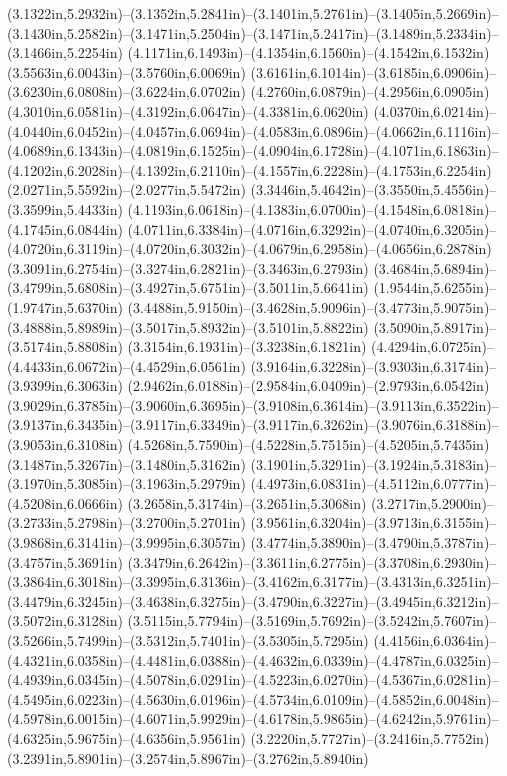 (3.1322in,5.2932in)--(3.1352in,5.2841in)--(3.1401in,5.2761in)--(3.1405in,5.2669in)--(3.1430in,5.2582in)--(3.1471in,5.2504in)--(3.1471in,5.2417in)--(3.1489in,5.2334in)--(3.1466in,5.2254in) (4.1171in,6.1493in)--(4.1354in,6.1560in)--(4.1542in,6.1532in) (3.5563in,6.0043in)--(3.5760in,6.0069in) (3.6161in,6.1014in)--(3.6185in,6.0906in)--(3.6230in,6.0808in)--(3.6224in,6.0702in) (4.2760in,6.0879in)--(4.2956in,6.0905in) (4.3010in,6.0581in)--(4.3192in,6.0647in)--(4.3381in,6.0620in) (4.0370in,6.0214in)--(4.0440in,6.0452in)--(4.0457in,6.0694in)--(4.0583in,6.0896in)--(4.0662in,6.1116in)--(4.0689in,6.1343in)--(4.0819in,6.1525in)--(4.0904in,6.1728in)--(4.1071in,6.1863in)--(4.1202in,6.2028in)--(4.1392in,6.2110in)--(4.1557in,6.2228in)--(4.1753in,6.2254in) (2.0271in,5.5592in)--(2.0277in,5.5472in) (3.3446in,5.4642in)--(3.3550in,5.4556in)--(3.3599in,5.4433in) (4.1193in,6.0618in)--(4.1383in,6.0700in)--(4.1548in,6.0818in)--(4.1745in,6.0844in) (4.0711in,6.3384in)--(4.0716in,6.3292in)--(4.0740in,6.3205in)--(4.0720in,6.3119in)--(4.0720in,6.3032in)--(4.0679in,6.2958in)--(4.0656in,6.2878in) (3.3091in,6.2754in)--(3.3274in,6.2821in)--(3.3463in,6.2793in) (3.4684in,5.6894in)--(3.4799in,5.6808in)--(3.4927in,5.6751in)--(3.5011in,5.6641in) (1.9544in,5.6255in)--(1.9747in,5.6370in) (3.4488in,5.9150in)--(3.4628in,5.9096in)--(3.4773in,5.9075in)--(3.4888in,5.8989in)--(3.5017in,5.8932in)--(3.5101in,5.8822in) (3.5090in,5.8917in)--(3.5174in,5.8808in) (3.3154in,6.1931in)--(3.3238in,6.1821in) (4.4294in,6.0725in)--(4.4433in,6.0672in)--(4.4529in,6.0561in) (3.9164in,6.3228in)--(3.9303in,6.3174in)--(3.9399in,6.3063in) (2.9462in,6.0188in)--(2.9584in,6.0409in)--(2.9793in,6.0542in) (3.9029in,6.3785in)--(3.9060in,6.3695in)--(3.9108in,6.3614in)--(3.9113in,6.3522in)--(3.9137in,6.3435in)--(3.9117in,6.3349in)--(3.9117in,6.3262in)--(3.9076in,6.3188in)--(3.9053in,6.3108in) (4.5268in,5.7590in)--(4.5228in,5.7515in)--(4.5205in,5.7435in) (3.1487in,5.3267in)--(3.1480in,5.3162in) (3.1901in,5.3291in)--(3.1924in,5.3183in)--(3.1970in,5.3085in)--(3.1963in,5.2979in) (4.4973in,6.0831in)--(4.5112in,6.0777in)--(4.5208in,6.0666in) (3.2658in,5.3174in)--(3.2651in,5.3068in) (3.2717in,5.2900in)--(3.2733in,5.2798in)--(3.2700in,5.2701in) (3.9561in,6.3204in)--(3.9713in,6.3155in)--(3.9868in,6.3141in)--(3.9995in,6.3057in) (3.4774in,5.3890in)--(3.4790in,5.3787in)--(3.4757in,5.3691in) (3.3479in,6.2642in)--(3.3611in,6.2775in)--(3.3708in,6.2930in)--(3.3864in,6.3018in)--(3.3995in,6.3136in)--(3.4162in,6.3177in)--(3.4313in,6.3251in)--(3.4479in,6.3245in)--(3.4638in,6.3275in)--(3.4790in,6.3227in)--(3.4945in,6.3212in)--(3.5072in,6.3128in) (3.5115in,5.7794in)--(3.5169in,5.7692in)--(3.5242in,5.7607in)--(3.5266in,5.7499in)--(3.5312in,5.7401in)--(3.5305in,5.7295in) (4.4156in,6.0364in)--(4.4321in,6.0358in)--(4.4481in,6.0388in)--(4.4632in,6.0339in)--(4.4787in,6.0325in)--(4.4939in,6.0345in)--(4.5078in,6.0291in)--(4.5223in,6.0270in)--(4.5367in,6.0281in)--(4.5495in,6.0223in)--(4.5630in,6.0196in)--(4.5734in,6.0109in)--(4.5852in,6.0048in)--(4.5978in,6.0015in)--(4.6071in,5.9929in)--(4.6178in,5.9865in)--(4.6242in,5.9761in)--(4.6325in,5.9675in)--(4.6356in,5.9561in) (3.2220in,5.7727in)--(3.2416in,5.7752in) (3.2391in,5.8901in)--(3.2574in,5.8967in)--(3.2762in,5.8940in) 